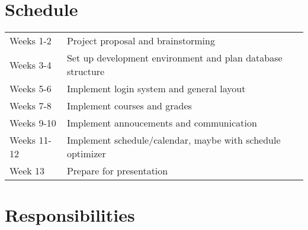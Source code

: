 \documentclass{article}
\begin{document}
\section{Schedule}

\begin{tabular}{ll}
    Weeks 1-2&Project proposal and brainstorming\\
    Weeks 3-4&Set up development environment and plan database structure\\
    Weeks 5-6&Implement login system and general layout\\
    Weeks 7-8&Implement courses and grades\\
    Weeks 9-10&Implement annoucements and communication\\
    Weeks 11-12&Implement schedule/calendar, maybe with schedule optimizer\\
    Week 13&Prepare for presentation\\
\end{tabular}

\section{Responsibilities}


\nocite{*}

{}

\end{document}
